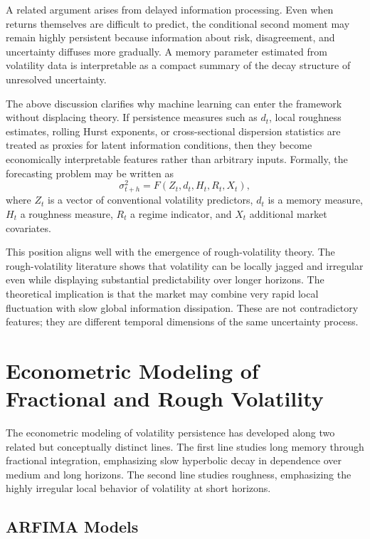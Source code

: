 \documentclass[12pt]{article}
\begin{document}
A related argument arises from delayed information processing. Even when returns themselves are difficult to predict, the conditional second moment may remain highly persistent because information about risk, disagreement, and uncertainty diffuses more gradually. A memory parameter estimated from volatility data is interpretable as a compact summary of the decay structure of unresolved uncertainty.

The above discussion clarifies why machine learning can enter the framework without displacing theory. If persistence measures such as $d_t$, local roughness estimates, rolling Hurst exponents, or cross-sectional dispersion statistics are treated as proxies for latent information conditions, then they become economically interpretable features rather than arbitrary inputs. Formally, the forecasting problem may be written as
\[
\sigma_{t+h}^2 = F(Z_t, d_t, H_t, R_t, X_t),
\]
where $Z_t$ is a vector of conventional volatility predictors, $d_t$ is a memory measure, $H_t$ a roughness measure, $R_t$ a regime indicator, and $X_t$ additional market covariates.

This position aligns well with the emergence of rough-volatility theory. The rough-volatility literature shows that volatility can be locally jagged and irregular even while displaying substantial predictability over longer horizons. The theoretical implication is that the market may combine very rapid local fluctuation with slow global information dissipation. These are not contradictory features; they are different temporal dimensions of the same uncertainty process.

\section{Econometric Modeling of Fractional and Rough Volatility}
\label{sec:econometric}

The econometric modeling of volatility persistence has developed along two related but conceptually distinct lines. The first line studies long memory through fractional integration, emphasizing slow hyperbolic decay in dependence over medium and long horizons. The second line studies roughness, emphasizing the highly irregular local behavior of volatility at short horizons.

\subsection{ARFIMA Models}
\end{document}
